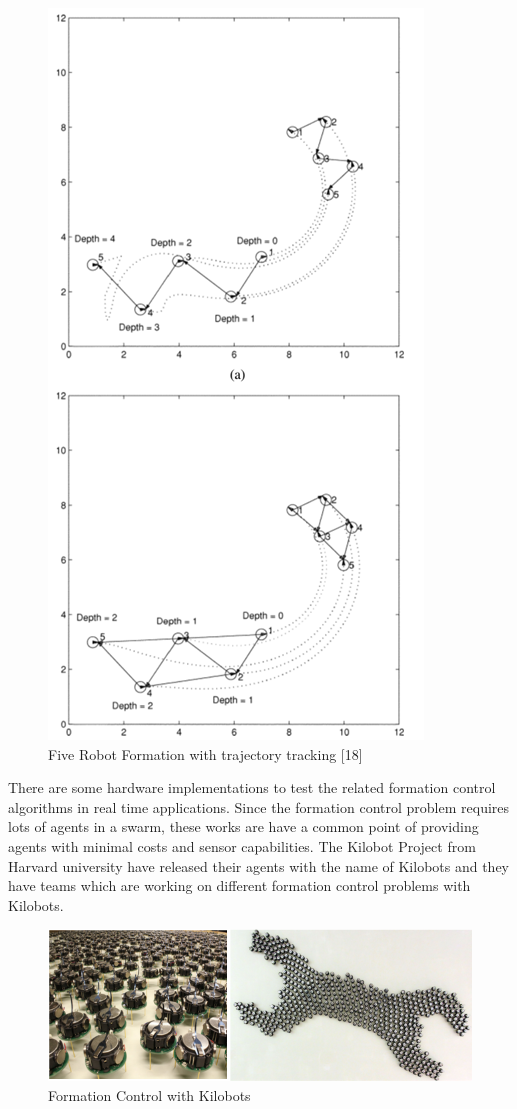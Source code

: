 \documentclass[twoside]{article}
\begin{document}
	\begin{figure}[H]
		\caption{Five Robot Formation with trajectory tracking [18]}
		\centering
		\includegraphics[scale = 1]{kumar}
	\end{figure} 

There are some hardware implementations to test the related formation control algorithms in real time applications. Since the formation control problem requires lots of agents in a swarm, these works are have a common point of providing agents with minimal costs and sensor capabilities. The Kilobot Project from Harvard university have released their agents with the name of Kilobots and they have teams which are working on different formation control problems with Kilobots.


	\begin{figure}[H]
		\caption{Formation Control with Kilobots}
		\centering
		\includegraphics[scale = 1]{kilobot}
	\end{figure} 
\end{document}
